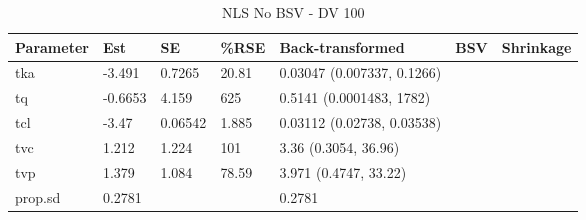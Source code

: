 \begin{table}
\centering\centering
\caption{NLS No BSV - DV 100}
\centering
\fontsize{8}{10}\selectfont
\begin{tabular}[t]{lllllll}
\toprule
\textbf{Parameter} & \textbf{Est} & \textbf{SE} & \textbf{\%RSE} & \textbf{Back-transformed} & \textbf{BSV} & \textbf{Shrinkage}\\
\midrule
tka & -3.491 & 0.7265 & 20.81 & 0.03047 (0.007337, 0.1266) &  & \\
\midrule
tq & -0.6653 & 4.159 & 625 & 0.5141 (0.0001483, 1782) &  & \\
\midrule
tcl & -3.47 & 0.06542 & 1.885 & 0.03112 (0.02738, 0.03538) &  & \\
\midrule
tvc & 1.212 & 1.224 & 101 & 3.36 (0.3054, 36.96) &  & \\
\midrule
tvp & 1.379 & 1.084 & 78.59 & 3.971 (0.4747, 33.22) &  & \\
\midrule
prop.sd & 0.2781 &  &  & 0.2781 &  & \\
\bottomrule
\end{tabular}
\end{table}